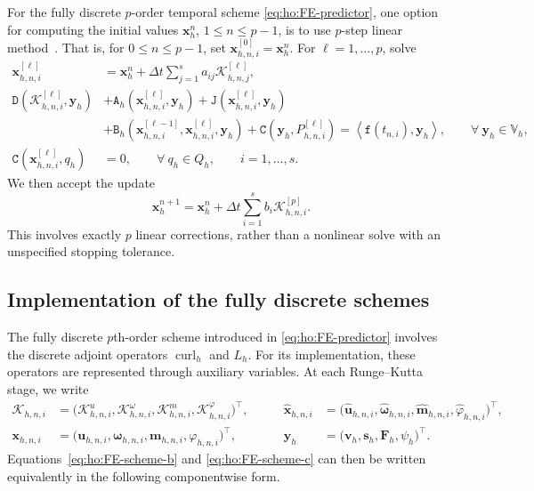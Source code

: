 \documentclass[11pt,a4paper]{article}
\newcommand{\bs}{\boldsymbol}
\newcommand{\dt}{\Delta t}
\DeclareMathOperator{\curl}{curl}
\newcommand{\V}{\mathbb V}
\newcommand{\DD}{\mathtt D}
\newcommand{\Aform}{\mathtt A}
\newcommand{\JJ}{\mathtt J}
\newcommand{\BB}{\mathtt B}
\newcommand{\CC}{\mathtt C}
\newcommand{\ff}{\mathtt f}
\newcommand{\dual}[2]{\left\langle#1,#2\right\rangle}
\theoremstyle{definition}
\numberwithin{equation}{section}
\begin{document}
For the fully discrete $p$-order temporal scheme \eqref{eq:ho:FE-predictor}, one option for computing the initial values $\bs x_h^n$, $1\le n\le p-1$, is to use
$p$-step linear method~\cite{HO_SatoMiyatakeButcher2023}. That is, for \(0\le n \le p-1\), set
\(\bs x_{h,n,i}^{[0]}=\bs x_h^n\). For \(\ell=1,\ldots,p\), solve
\begin{equation}\label{eq:ho:FE-startup}
\begin{aligned}
 \bs x_{h,n,i}^{[\ell]}&=\bs x_h^n+\dt\sum_{j=1}^s a_{ij}\mathcal K_{h,n,j}^{[\ell]},\\
 \DD(\mathcal K_{h,n,i}^{[\ell]},\bs y_h)
 &+\Aform_h(\bs x_{h,n,i}^{[\ell]},\bs y_h)+\JJ(\bs x_{h,n,i}^{[\ell]},\bs y_h)\\
 &+\BB_h(\bs x_{h,n,i}^{[\ell-1]},\bs x_{h,n,i}^{[\ell]},\bs y_h)
   +\CC(\bs y_h,P_{h,n,i}^{[\ell]})=\dual{\ff(t_{n,i})}{\bs y_h},\qquad\forall~\bs y_h\in \V_h,\\
 \CC(\bs x_{h,n,i}^{[\ell]},q_h)&=0,\qquad\forall~q_h\in Q_h,
 \qquad i=1,\ldots,s.
\end{aligned}
\end{equation}
We then accept the update
\begin{equation}\label{eq:ho:FE-startup-update}
 \bs x_h^{n+1}=\bs x_h^n+\dt\sum_{i=1}^s b_i\mathcal K_{h,n,i}^{[p]}.
\end{equation}
This involves exactly \(p\) linear corrections, rather than a nonlinear solve with an unspecified stopping tolerance.


\subsection{Implementation of the fully discrete schemes}

The fully discrete \(p\)th-order scheme introduced in
\eqref{eq:ho:FE-predictor} involves the discrete adjoint operators
\(\curl_h\) and \(L_h\). For its implementation, these operators are
represented through auxiliary variables. At each Runge--Kutta stage, we write
\[
\begin{aligned}
\mathcal K_{h,n,i}
&=
\bigl(
\mathcal K_{h,n,i}^u,
\mathcal K_{h,n,i}^\omega,
\mathcal K_{h,n,i}^m,
\mathcal K_{h,n,i}^\varphi
\bigr)^\intercal,
&\qquad
\widehat{\bs x}_{h,n,i}
&=
\bigl(
\widehat{\bs u}_{h,n,i},
\widehat{\bs\omega}_{h,n,i},
\widehat{\bs m}_{h,n,i},
\widehat{\varphi}_{h,n,i}
\bigr)^\intercal,
\\
\bs x_{h,n,i}
&=
\bigl(
\bs u_{h,n,i},
\bs\omega_{h,n,i},
\bs m_{h,n,i},
\varphi_{h,n,i}
\bigr)^\intercal,
&\qquad
\bs y_h
&=
\bigl(
\bs v_h,
\bs s_h,
\bs F_h,
\psi_h
\bigr)^\intercal.
\end{aligned}
\]
Equations~\eqref{eq:ho:FE-scheme-b} and
\eqref{eq:ho:FE-scheme-c} can then be written equivalently in the
following componentwise form.
\end{document}
